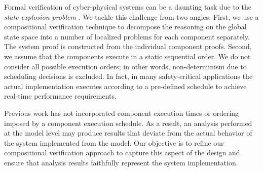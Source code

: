 
Formal verification of cyber-physical systems can be a daunting task due to the \emph{state
explosion problem} \cite{Clarke2012}. We tackle this challenge from two angles. First, we use a
compositional verification technique \cite{pnueli} \cite{cmc} to decompose the reasoning on the global state space into a
number of localized problems for each component separately. The system proof is constructed
from the individual component proofs. Second, we assume that the components execute in a static 
sequential order. We do not consider all possible execution orders; in other words, non-determinism
due to scheduling decisions is excluded. In fact, in many safety-critical applications the actual
implementation executes according to a pre-defined schedule \cite{executive} to achieve real-time performance
requirements.  

Previous work has not incorporated component execution times or ordering imposed by 
a component execution schedule. As a result, an analysis performed at the model level 
may produce results that deviate from the actual behavior of the system implemented 
from the model.  Our objective is to refine our compositional verification approach to capture 
this aspect of the design and ensure that analysis results faithfully represent the system 
implementation.  

